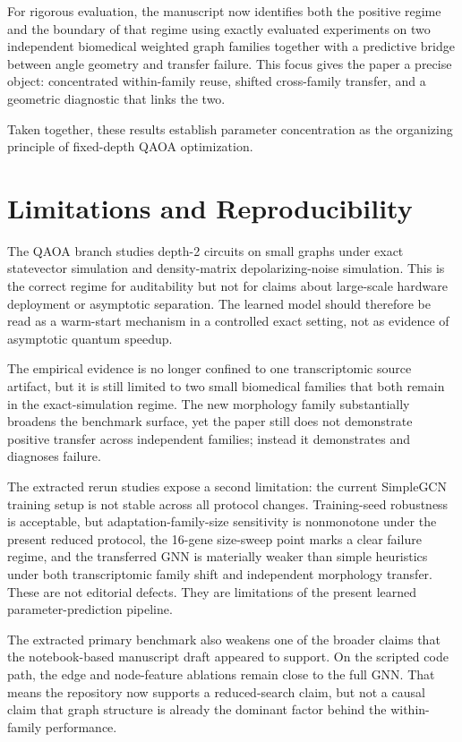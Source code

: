 \documentclass[
  reprint,
  twocolumn,
  aps,
  superscriptaddress,
  longbibliography,
  floatfix
]{revtex4-2}
\begin{document}
For rigorous evaluation, the manuscript now identifies both the positive regime and the boundary of that regime using exactly evaluated experiments on two independent biomedical weighted graph families together with a predictive bridge between angle geometry and transfer failure. This focus gives the paper a precise object: concentrated within-family reuse, shifted cross-family transfer, and a geometric diagnostic that links the two.

Taken together, these results establish parameter concentration as the organizing principle of fixed-depth QAOA optimization.

\section{Limitations and Reproducibility}
The QAOA branch studies depth-2 circuits on small graphs under exact statevector simulation and density-matrix depolarizing-noise simulation. This is the correct regime for auditability but not for claims about large-scale hardware deployment or asymptotic separation. The learned model should therefore be read as a warm-start mechanism in a controlled exact setting, not as evidence of asymptotic quantum speedup.

The empirical evidence is no longer confined to one transcriptomic source artifact, but it is still limited to two small biomedical families that both remain in the exact-simulation regime. The new morphology family substantially broadens the benchmark surface, yet the paper still does not demonstrate positive transfer across independent families; instead it demonstrates and diagnoses failure.

The extracted rerun studies expose a second limitation: the current SimpleGCN training setup is not stable across all protocol changes. Training-seed robustness is acceptable, but adaptation-family-size sensitivity is nonmonotone under the present reduced protocol, the 16-gene size-sweep point marks a clear failure regime, and the transferred GNN is materially weaker than simple heuristics under both transcriptomic family shift and independent morphology transfer. These are not editorial defects. They are limitations of the present learned parameter-prediction pipeline.

The extracted primary benchmark also weakens one of the broader claims that the notebook-based manuscript draft appeared to support. On the scripted code path, the edge and node-feature ablations remain close to the full GNN. That means the repository now supports a reduced-search claim, but not a causal claim that graph structure is already the dominant factor behind the within-family performance.
\end{document}
